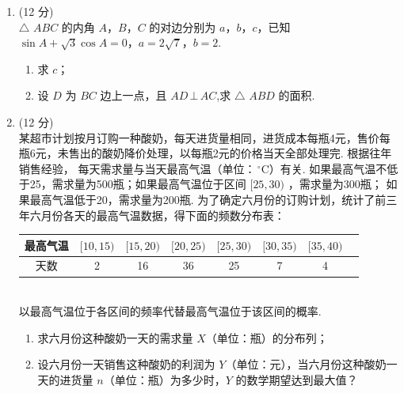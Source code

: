 \documentclass[12pt,space]{ctexart} %
\begin{document}
\begin{enumerate}[itemsep=-0.3em,topsep=0pt,resume]%
  \item (12 分)\\
    $\triangle$ $ABC$ 的内角 $A$，$B$，$C$ 的对边分别为 $a$，$b$，$c$，已知 $\sin A+\sqrt{3}\cos A=0$，$a=2\sqrt{7}$，$b=2$.
    \begin{enumerate}[itemsep=-0.3em,label={(\arabic*)},topsep=0pt,labelsep=.5em,leftmargin=1.7em]
      \item 求 $c$；
      \item 设 $D$ 为 $BC$ 边上一点，且 $AD\,\bot \,AC$,求 $\triangle$ $ABD$ 的面积.
    \end{enumerate}

  \item (12 分)\\
    某超市计划按月订购一种酸奶，每天进货量相同，进货成本每瓶4元，售价每瓶6元，未售出的酸奶降价处理，以每瓶2元的价格当天全部处理完. 根据往年销售经验，
    每天需求量与当天最高气温（单位：$\,^{\circ}\mathrm{C}$）有关. 如果最高气温不低于25，需求量为500瓶；如果最高气温位于区间 $[25,30)$ ，需求量为300瓶；
    如果最高气温低于20，需求量为200瓶. 为了确定六月份的订购计划，统计了前三年六月份各天的最高气温数据，得下面的频数分布表：\\[-2em]
    \begin{table}[htbp]
      \centering
      \begin{tabular}{|c|c|c|c|c|c|c|c|}\hline
      最高气温 & $[10,15)$& $[15,20)$ & $[20,25)$ & $[25,30)$ & $[30,35)$ & $[35,40)$\\\hline
      天数     & 2        & 16       &36        &25        &7         &4         \\\hline
      \end{tabular}
    \end{table}\\[-1em]
    以最高气温位于各区间的频率代替最高气温位于该区间的概率. 
    \begin{enumerate}[itemsep=-0.3em,label={(\arabic*)},topsep=0pt,labelsep=.5em,leftmargin=1.7em]
      \item 求六月份这种酸奶一天的需求量 $X$（单位：瓶）的分布列；
      \item 设六月份一天销售这种酸奶的利润为 $Y$（单位：元），当六月份这种酸奶一天的进货量 $n$（单位：瓶）为多少时，$Y$ 的数学期望达到最大值？
    \end{enumerate}


\end{enumerate}
\end{document}
